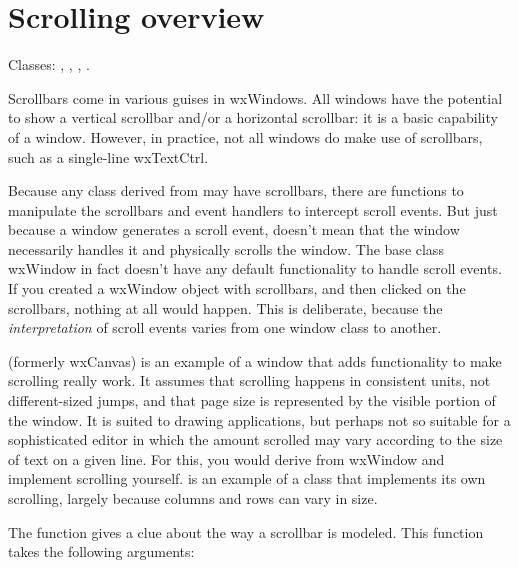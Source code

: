 \section{Scrolling overview}\label{scrollingoverview}

Classes: , , , .

Scrollbars come in various guises in wxWindows. All windows have the potential
to show a vertical scrollbar and/or a horizontal scrollbar: it is a basic capability of a window.
However, in practice, not all windows do make use of scrollbars, such as a single-line wxTextCtrl.

Because any class derived from   may have scrollbars,
there are functions to manipulate the scrollbars and event handlers to intercept
scroll events. But just because a window generates a scroll event, doesn't mean
that the window necessarily handles it and physically scrolls the window. The base class
wxWindow in fact doesn't have any default functionality to handle scroll events.
If you created a wxWindow object with scrollbars, and then clicked on the scrollbars, nothing
at all would happen. This is deliberate, because the {\it interpretation} of scroll
events varies from one window class to another.

 (formerly wxCanvas) is an example of a window that
adds functionality to make scrolling really work. It assumes that scrolling happens in
consistent units, not different-sized jumps, and that page size is represented
by the visible portion of the window. It is suited to drawing applications, but perhaps
not so suitable for a sophisticated editor in which the amount scrolled may vary according
to the size of text on a given line. For this, you would derive from wxWindow and
implement scrolling yourself.  is an example of a class
that implements its own scrolling, largely because columns and rows can vary in size.


The function  gives a clue about
the way a scrollbar is modeled. This function takes the following arguments:

\twocolwidtha{5cm}%
\begin{twocollist}
\end{twocollist}%


